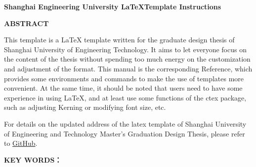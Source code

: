 
\begin{center}\heiti\sanhao\bfseries
    Shanghai Engineering University \LaTeX Template Instructions

\end{center}

\begin{center}\heiti\sanhao\textbf{
    ABSTRACT
}
\end{center}

This template is a \LaTeX{} template written for the graduate design thesis of Shanghai University of Engineering Technology. It aims to let everyone focus on the content of the thesis without spending too much energy on the customization and adjustment of the format. This manual is the corresponding Reference, which provides some environments and commands to make the use of templates more convenient. At the same time, it should be noted that users need to have some experience in using \LaTeX{}, 
and at least use some functions of the ctex package, such as adjusting Kerning or modifying font size, etc.

For details on the updated address of the latex template of Shanghai University of Engineering and Technology Master's Graduation Design Thesis, please refer to \href{https://github.com/MobtgZhang/SUES-thsis}{GitHub}.

\vspace{1cm}

\noindent \textbf{KEY WORDS：}

\clearpage

